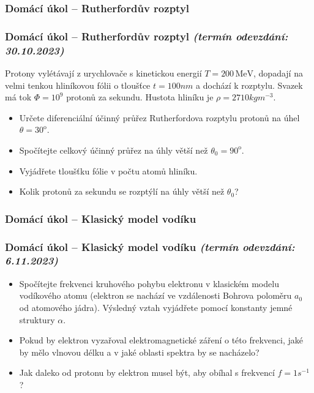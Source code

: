 \documentclass[a4paper,11pt,twoside]{article}
\newenvironment{homework}{}{}
\newcommand{\np}{\clearpage\newpage}
\newcommand{\exercise}[2][]{\ifthenelse{\isempty{#1}}
	{\np\thispagestyle{empty}\subsubsection*{Domácí úkol -- #2}}
	{\np\thispagestyle{empty}\np\subsubsection*{Domácí úkol -- #2 \small{\it{(termín odevzdání: {#1})}}}}
}
\begin{document}
\begin{homework}
	\exercise[30.10.2023]{Rutherfordův rozptyl}
    Protony vylétávají z urychlovače s kinetickou energií $T=200\,\mathrm{MeV}$, dopadají na velmi tenkou hliníkovou fólii o tloušťce $t=100\unit{nm}$ a dochází k rozptylu.
    Svazek má tok $\Phi=10^{9}$ protonů za sekundu.
	Hustota hliníku je $\rho=2710\unit{kg}\unit{m^{-3}}$.

    \begin{itemize}
        \item Určete diferenciální účinný průřez Rutherfordova rozptylu protonů na úhel $\theta=30^{\mathrm{o}}$.
        \item Spočítejte celkový účinný průřez na úhly větší než $\theta_0=90^{\mathrm{o}}$.
        \item Vyjádřete tloušťku fólie v počtu atomů hliníku.
        \item Kolik protonů za sekundu se rozptýlí na úhly větší než $\theta_0$?
    \end{itemize}

\newpage
\end{homework}
	
\begin{homework}
	\exercise[6.11.2023]{Klasický model vodíku}
	\begin{itemize}
		\item     
			Spočítejte frekvenci kruhového pohybu elektronu v klasickém modelu vodíkového atomu (elektron se nachází ve vzdálenosti Bohrova poloměru $a_{0}$ od atomového jádra).
			Výsledný vztah vyjádřete pomocí konstanty jemné struktury $\alpha$.
		\item
			Pokud by elektron vyzařoval elektromagnetické záření o této frekvenci, jaké by mělo vlnovou délku a v jaké oblasti spektra by se nacházelo?
		\item
			Jak daleko od protonu by elektron musel být, aby obíhal s frekvencí $f=1\unit{s^{-1}}$?
	\end{itemize}

\newpage
\end{homework}
\end{document}
